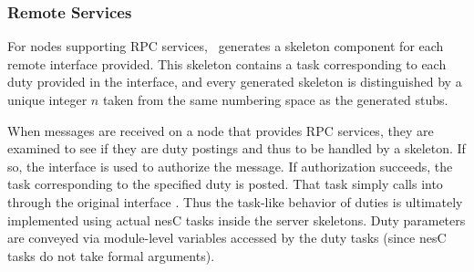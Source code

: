 \subsubsection{Remote Services}

For nodes supporting RPC services, \Sprocket\ generates a skeleton
component for each remote interface provided. This skeleton contains a
task corresponding to each duty provided in the interface, and every
generated skeleton is distinguished by a unique integer $n$ taken from
the same numbering space as the generated stubs.


%
%
%

When messages are received on a node that provides RPC services, they
are examined to see if they are duty postings and thus to be handled by
a skeleton. If so, the  interface is used to
authorize the message. If authorization succeeds, the task corresponding
to the specified duty is posted. That task simply calls into
 through the original interface
. Thus the task-like behavior of duties is ultimately
implemented using actual nesC tasks inside the server skeletons. Duty
parameters are conveyed via module-level variables accessed by the duty
tasks (since nesC tasks do not take formal arguments).

